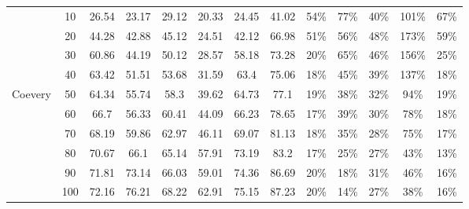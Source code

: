\begin{table}[!ht]
\begin{center}
{\begin{tabular}{|c|c|c|c|c|c|c||c|c|c|c|c|c|}
 &10	&26.54	&23.17	&29.12	&20.33	&24.45	&41.02	&54\%	&77\%	&40\%&	101\%	&67\%	\\
 &20	&44.28	&42.88	&45.12	&24.51	&42.12	&66.98	&51\%	&56\%	&48\%	&173\%	&59\%	\\
 &30	&60.86	&44.19	&50.12	&28.57	&58.18	&73.28	&20\%	&65\%	&46\%	&156\%	&25\%	\\
 &40	&63.42	&51.51	&53.68	&31.59	&63.4	&75.06	&18\%	&45\%	&39\%	&137\%	&18\%	\\
 Coevery &50	&64.34	&55.74	&58.3	&39.62	&64.73	&77.1	&19\%	&38\% 	&32\%	&94\%	&19\%	\\
 &60	&66.7	&56.33	&60.41	&44.09	&66.23	&78.65	&17\%	&39\% 	&30\%	&78\%	&18\%	\\
 &70	&68.19	&59.86	&62.97	&46.11	&69.07	&81.13	&18\%	&35\%	&28\%	&75\%	&17\%	\\
 &80	&70.67	&66.1	&65.14	&57.91	&73.19	&83.2	&17\%	&25\%	&27\%	&43\%	&13\%	\\
 &90	&71.81	&73.14	&66.03	&59.01	&74.36	&86.69	&20\%	&18\%	&31\%	&46\%	&16\%	\\
 &100	&72.16	&76.21	&68.22	&62.91	&75.15	&87.23	&20\%	&14\% 	&27\%	&38\%	&16\%	\\\hline  
 

\end{tabular}}
\end{center}
\end{table}

